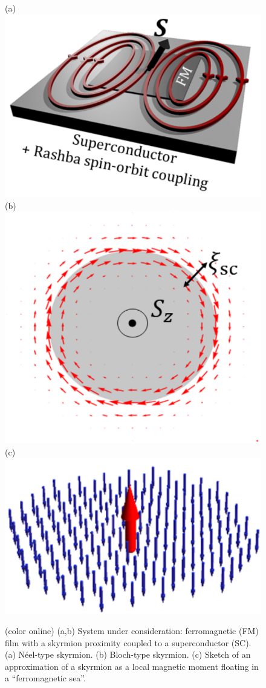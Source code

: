 \documentclass[twocolumn,showpacs,floatfix,longbibliography]{revtex4-1}
\begin{document}
\begin{figure} \centering
(a) \includegraphics[width=0.4\linewidth]{fig1a}
(b) \includegraphics[width=0.4\linewidth]{fig1b} \\
(c) \includegraphics[width=0.4\linewidth]{fig1c}
\caption{(color online) (a,b) System under consideration: ferromagnetic (FM) film with a skyrmion proximity coupled to a superconductor (SC). (a) N\'eel-type skyrmion.  (b) Bloch-type skyrmion. (c) Sketch of an approximation of a skyrmion as a local magnetic moment floating in a ``ferromagnetic sea''.} \label{fig:skyrmion}
\end{figure}
\end{document}
